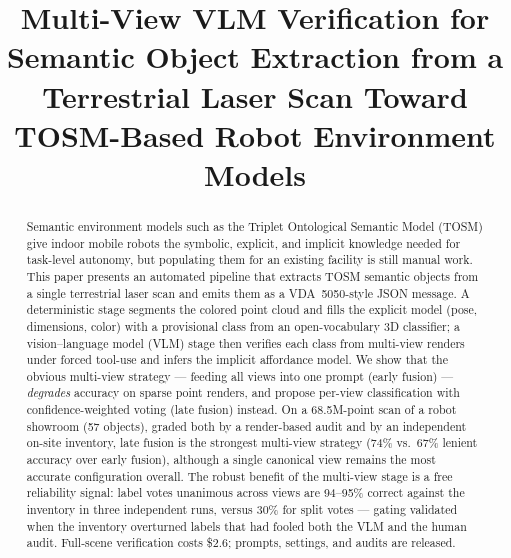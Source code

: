 \documentclass[conference]{IEEEtran}
\begin{document}
\title{Multi-View VLM Verification for Semantic Object Extraction from a
Terrestrial Laser Scan Toward TOSM-Based Robot Environment Models}

\author{
}

\maketitle

\begin{abstract}
Semantic environment models such as the Triplet Ontological Semantic Model
(TOSM) give indoor mobile robots the symbolic, explicit, and implicit
knowledge needed for task-level autonomy, but populating them for an
existing facility is still manual work. This paper presents an automated
pipeline that extracts TOSM semantic objects from a single terrestrial
laser scan and emits them as a VDA~5050-style JSON message. A deterministic stage segments the colored point cloud and fills the
explicit model (pose, dimensions, color) with a provisional class from an
open-vocabulary 3D classifier; a vision--language model (VLM) stage then
verifies each class from multi-view renders under forced tool-use and
infers the implicit affordance model. We show that the obvious multi-view strategy ---
feeding all views into one prompt (early fusion) --- \emph{degrades}
accuracy on sparse point renders, and propose per-view classification with
confidence-weighted voting (late fusion) instead. On a 68.5M-point scan of
a robot showroom (57 objects), graded both by a render-based audit and by
an independent on-site inventory, late fusion is the strongest multi-view
strategy (74\% vs.\ 67\% lenient accuracy over early fusion), although a
single canonical view remains the most accurate configuration overall. The
robust benefit of the multi-view stage is a free reliability signal: label
votes unanimous across views are 94--95\% correct against the inventory in
three independent runs, versus 30\% for split votes --- gating validated
when the inventory overturned labels that had fooled both the VLM and the
human audit. Full-scene verification costs \$2.6; prompts, settings, and audits are
released.
\end{abstract}
\end{document}
